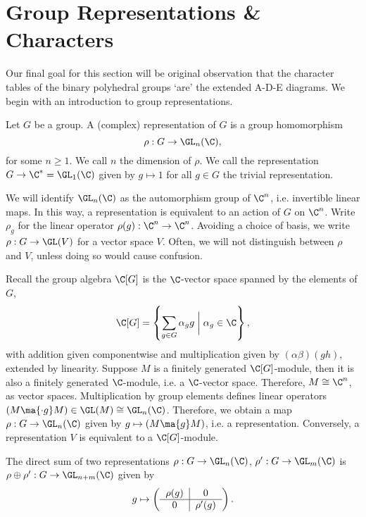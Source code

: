 \newpage
\section{Group Representations \& Characters}

Our final goal for this section will be \mc original observation that the character tables of the binary polyhedral groups `are' the extended A-D-E diagrams. We begin with an introduction to group representations.


\begin{dfn}[Representation]
Let $G$ be a group. A (complex) representation of $G$ is a group homomorphism
	\[
	\rho: G \to \GL_n(\C),
	\]
for some $n \geq 1$. We call $n$ the dimension of $\rho$. We call the representation $G \to \C^*=\GL_1(\C)$ given by $g \mapsto 1$ for all $g \in G$ the trivial representation. 
\end{dfn}


We will identify $\GL_n(\C)$ as the automorphism group of $\C^n$, i.e. invertible linear maps. In this way, a representation is equivalent to an action of $G$ on $\C^n$. Write $\rho_g$ for the linear operator $\rho(g): \C^n \to \C^n$. Avoiding a choice of basis, we write $\rho: G \to \GL(V)$ for a vector space $V$. Often, we will not distinguish between $\rho$ and $V$, unless doing so would cause confusion. 


\begin{rem}
Recall the group algebra $\C[G]$ is the $\C$-vector space spanned by the elements of $G$,
	\[
	\C[G]= \left\{ \sum_{g \in G} \alpha_g g \;\bigg|\; \alpha_g \in \C \right\},
	\]
with addition given componentwise and multiplication given by $(\alpha\beta)(gh)$, extended by linearity. Suppose $M$ is a finitely generated $\C[G]$-module, then it is also a finitely generated $\C$-module, i.e. a $\C$-vector space. Therefore, $M \cong \C^n$, as vector spaces. Multiplication by group elements defines linear operators $(M \ma{\cdot g} M) \in \GL(M)\cong\GL_n(\C)$. Therefore, we obtain a map $\rho: G \to \GL_n(\C)$ given by $g \mapsto (M \ma{g} M)$, i.e. a representation. Conversely, a representation $V$ is equivalent to a $\C[G]$-module. 
\end{rem}


The direct sum of two representations $\rho: G \to \GL_n(\C)$, $\rho': G \to \GL_m(\C)$ is $\rho \oplus \rho' : G \to \GL_{n+m}(\C)$ given by 
	\[
	g \mapsto \left(\begin{tabular}{c|c} $\rho(g)$ & 0 \\ \hline 0 & $\rho'(g)$ \end{tabular}\right).
	\]

